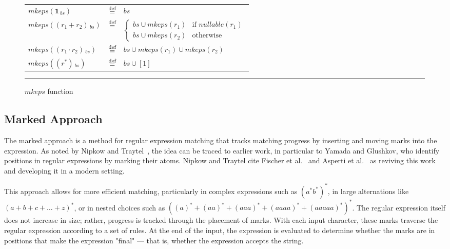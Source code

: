 \documentclass[12pt]{article}
\newcommand{\dn}{\ensuremath{\stackrel{\mbox{\scriptsize def}}{=}}}
\newcommand{\ONE}{\textbf{1}}
\newcommand{\mkeps}{\textit{mkeps}}
\newcommand{\nullable}{\textit{nullable}}
\begin{document}
\begin{figure}[ht]
  \begin{center}
    \renewcommand{\arraystretch}{1.5}
    \begin{tabular}{lcl}
      $ \mkeps(\ONE\,_{bs}) $                & \dn & $ bs $ \\
      $ \mkeps((r_1 + r_2)\,_{bs}) $         & \dn &
      $ \begin{cases}
      bs \cup \mkeps(r_1) & \text{if } \nullable(r_1) \\
      bs \cup \mkeps(r_2) & \text{otherwise}
      \end{cases} $ \\
      $ \mkeps((r_1 \cdot r_2)\,_{bs}) $     & \dn & $ bs \cup \mkeps(r_1) \cup \mkeps(r_2) $ \\
      $ \mkeps((r^*)\,_{bs}) $               & \dn & $ bs \cup [1] $ \\
    \end{tabular}
    \renewcommand{\arraystretch}{1.0}

    \mbox{}
    \rule{\linewidth}{0.4pt}
    \caption{$\mkeps$ function}\label{mkepsFunction}
  \end{center}
\end{figure}

\FloatBarrier
\subsection{Marked Approach}

The marked approach is a method for regular expression matching that tracks 
matching progress by inserting and moving marks into the expression.  
As noted by Nipkow and Traytel~\cite{NipkowTraytel2014}, the idea can be traced
to earlier work, in particular to Yamada and Glushkov, who identify positions
in regular expressions by marking their atoms. Nipkow and Traytel cite Fischer et al.~\cite{Fischer2010} and
 Asperti et al.~\cite{Asperti2010} as reviving this work and developing it in a modern setting.

This approach allows for more efficient matching, particularly in complex
expressions such as $(a^*b^*)^*$, in large alternations like
$(a+b+c+\dots+z)^*$, or in nested choices such as
$((a)^* + (aa)^* + (aaa)^* + (aaaa)^* + (aaaaa)^*)^*$. The regular expression itself does not increase in size;
 rather, progress is tracked through the placement of marks.
With each input character, these marks traverse the regular expression according to a set of rules.  
At the end of the input, the expression is evaluated to determine whether the marks 
are in positions that make the expression "final" — that is, whether the expression accepts
 the string.
\end{document}
